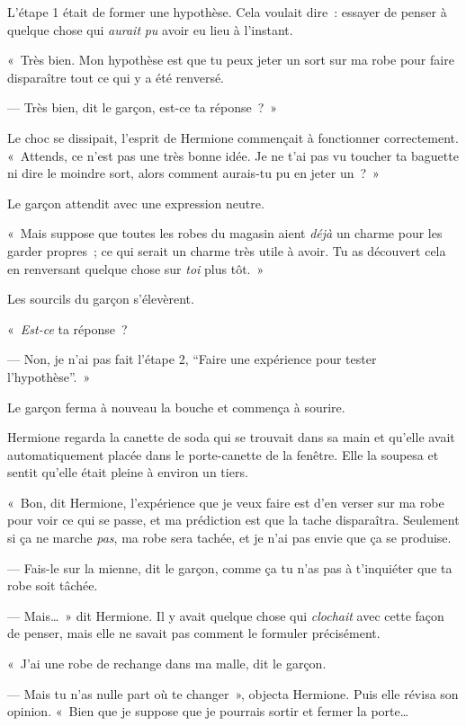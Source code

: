 L'étape 1 était de former une hypothèse. Cela voulait dire~: essayer de penser à quelque chose qui \emph{aurait} \emph{pu} avoir eu lieu à l'instant.

«~Très bien. Mon hypothèse est que tu peux jeter un sort sur ma robe pour faire disparaître tout ce qui y a été renversé.

--- Très bien, dit le garçon, est-ce ta réponse~?~»

Le choc se dissipait, l'esprit de Hermione commençait à fonctionner correctement. «~Attends, ce n'est pas une très bonne idée. Je ne t'ai pas vu toucher ta baguette ni dire le moindre sort, alors comment aurais-tu pu en jeter un~?~»

Le garçon attendit avec une expression neutre.

«~Mais suppose que toutes les robes du magasin aient \emph{déjà} un charme pour les garder propres~; ce qui serait un charme très utile à avoir. Tu as découvert cela en renversant quelque chose sur \emph{toi} plus tôt.~»

Les sourcils du garçon s'élevèrent.

«~\emph{Est-ce} ta réponse~?

--- Non, je n'ai pas fait l'étape 2, “Faire une expérience pour tester l'hypothèse”.~»

Le garçon ferma à nouveau la bouche et commença à sourire.

Hermione regarda la canette de soda qui se trouvait dans sa main et qu'elle avait automatiquement placée dans le porte-canette de la fenêtre. Elle la soupesa et sentit qu'elle était pleine à environ un tiers.

«~Bon, dit Hermione, l'expérience que je veux faire est d'en verser sur ma robe pour voir ce qui se passe, et ma prédiction est que la tache disparaîtra. Seulement si ça ne marche \emph{pas}, ma robe sera tachée, et je n'ai pas envie que ça se produise.

--- Fais-le sur la mienne, dit le garçon, comme ça tu n'as pas à t'inquiéter que ta robe soit tâchée.

--- Mais…~» dit Hermione. Il y avait quelque chose qui \emph{clochait} avec cette façon de penser, mais elle ne savait pas comment le formuler précisément.

«~J'ai une robe de rechange dans ma malle, dit le garçon.

--- Mais tu n'as nulle part où te changer~», objecta Hermione. Puis elle révisa son opinion. «~Bien que je suppose que je pourrais sortir et fermer la porte…

